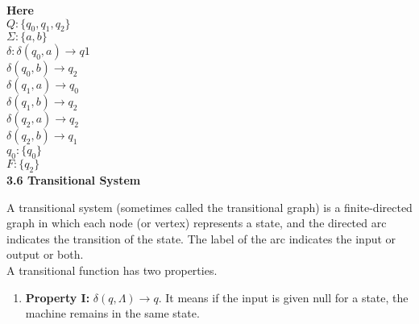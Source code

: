 \documentclass[8pt]{beamer}
\begin{document}
\begin{frame}
\vspace*{0.2cm}
\textbf{Here}\\
\hspace*{1.5cm} $Q : \{q_{0}, q_{1}, q_{2}\}$ \\
\hspace*{1.5cm} $\Sigma : \{a, b\}$ \\
\hspace*{1.5cm} $\delta : \delta(q_{0}, a) \rightarrow q1$ \\
\hspace*{2cm} $\delta(q_{0}, b) \rightarrow q_{2}$ \\
\hspace*{2cm} $\delta(q_{1}, a) \rightarrow q_{0}$ \\
\hspace*{2cm} $\delta(q_{1}, b) \rightarrow q_{2}$ \\
\hspace*{2cm} $\delta(q_{2}, a) \rightarrow q_{2}$ \\
\hspace*{2cm} $\delta(q_{2}, b) \rightarrow q_{1}$ \\
\hspace*{1.5cm} $q_{0} : \{q_{0}\}$ \\
\hspace*{1.5cm} $F : \{q_{2}\}$ \\

\vspace*{0.1cm}
\large{
\textbf{3.6 Transitional System}\\
}

\vspace*{0.2cm}
\small{
A transitional system (sometimes called the transitional graph) is a finite-directed graph in which each
node (or vertex) represents a state, and the directed arc indicates the transition of the state. The label of
the arc indicates the input or output or both.\\
\hspace*{0.5cm} A transitional function has two properties.\\

\vspace*{0.1cm}
\begin{enumerate}
  \item \textbf{Property I:} $\delta(q, \Lambda) \rightarrow q.$ It means if the input is given null for a state, the machine remains in the
same state.\\
\end{enumerate}
}
\end{frame}
\end{document}
